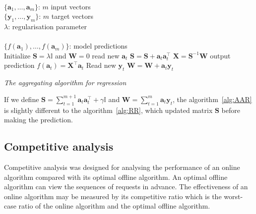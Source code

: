 \begin{algorithm}[ht]
\begin{algorithmic}[1]
\REQUIRE $\,$ \\
$\{\mathbf{a}_1,\dots,\mathbf{a}_{m} \}$: $m$ input vectors \\
$\{\mathbf{y}_1,\dots,\mathbf{y}_{m} \}$: $m$ target vectors \\
$\lambda$: regularisation parameter \\
\ENSURE  $\,$ \\
$\{f(\mathbf{a}_1),\dots,f(\mathbf{a}_{m}) \}$: model predictions \\
\STATE Initialize $\mathbf{S}=\lambda \mathbb{I}$
and $\mathbf{W}=0$
	\STATE read new $\mathbf{a}_t$
   	\STATE $\mathbf{S} = \mathbf{S} + \mathbf{a}_t \mathbf{a}_t^\intercal$
	\STATE $\mathbf{X}=\mathbf{S}^{-1}\mathbf{W}$
	\STATE output prediction $f(\mathbf{a}_t) = \mathbf{X}^\intercal \mathbf{a}_t$
   	\STATE Read new $\mathbf{y}_t$
    	\STATE $\mathbf{W} = \mathbf{W} + \mathbf{a}_t \mathbf{y}_t$
\ENDFOR
\end{algorithmic}
\caption{{\em The aggregating algorithm for regression}}
\label{alg:AAR}
\end{algorithm}

If we define $\displaystyle\mathbf{S}= \sum_{t=1}^{m+1} \mathbf{a}_t
\mathbf{a}_t  ^\intercal + \gamma \mathbb{I} $ and $\mathbf{W}=
\displaystyle\sum_{t=1}^m \mathbf{a}_t \mathbf{y}_t$, the
algorithm~\ref{alg:AAR} is slightly different to the algorithm~\ref{alg:RR}, 
which updated matrix $\mathbf{S}$ before making the prediction.

\subsection{Competitive analysis}

Competitive analysis was designed for analysing the performance of an online algorithm compared with its optimal offline algorithm. An optimal offline algorithm can view the sequences of requests in advance. The effectiveness of an online algorithm \cite{sleator1985} may be measured by its competitive ratio which is the worst-case ratio of the online algorithm and the optimal offline algorithm.




